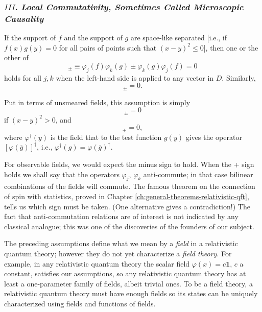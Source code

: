 \subsubsection*{$III$. \emph{Local Commutativity, Sometimes Called Microscopic
Causality}}

If the support of $f$ and the support of $g$ are space-like separated [i.e.,
if $f(x)g(y)=0$ for all pairs of points such that $(x-y)^2\leq0$], then one
or the other of
\begin{equation}
  [\varphi_j(f),\varphi_k(g)]_{\pm}
  \equiv \varphi_j(f)\varphi_k(g)\pm\varphi_k(g)\varphi_j(f)=0
  \tag{3-6}\label{eq:ch3-local}
\end{equation}
holds for all $j,k$ when the left-hand side is applied to any vector in $D$.
Similarly,
\begin{equation*}
  [\varphi_j(f),\varphi_k(g)^\dagger]_{\pm}=0.
\end{equation*}

Put in terms of unsmeared fields, this assumption is simply
\begin{equation*}
  [\varphi_j(x),\varphi_k(y)]_{\pm}=0
\end{equation*}
if $(x-y)^2>0$, and
\begin{equation*}
  [\varphi_j(x),\varphi_k^\dagger(y)]_{\pm}=0,
\end{equation*}
where $\varphi^\dagger(y)$ is the field that to the test function $g(y)$
gives the operator $[\varphi(\overline{g})]^\dagger$, i.e.,
$\varphi^\dagger(g)=\varphi(\overline{g})^\dagger$.

For observable fields, we would expect the minus sign to hold. When the +
sign holds we shall say that the operators $\varphi_j$, $\varphi_k$
anti-commute; in that case bilinear combinations of the fields will commute.
The famous theorem on the connection of spin with statistics, proved in
Chapter \ref{ch:general-theorems-relativistic-qft}, tells us which sign must be taken. (One alternative gives a
contradiction!) The fact that anti-commutation relations are of interest is
not indicated by any classical analogue; this was one of the discoveries of
the founders of our subject.

The preceding assumptions define what we mean by a \emph{field} in a
relativistic quantum theory; however they do not yet characterize a
\emph{field theory}. For example, in any relativistic quantum theory the
scalar field $\varphi(x)=c\mathbf{1}$, $c$ a constant, satisfies our
assumptions, so any relativistic quantum theory has at least a one-parameter
family of fields, albeit trivial ones. To be a field theory, a relativistic
quantum theory must have enough fields so its states can be uniquely
characterized using fields and functions of fields.

